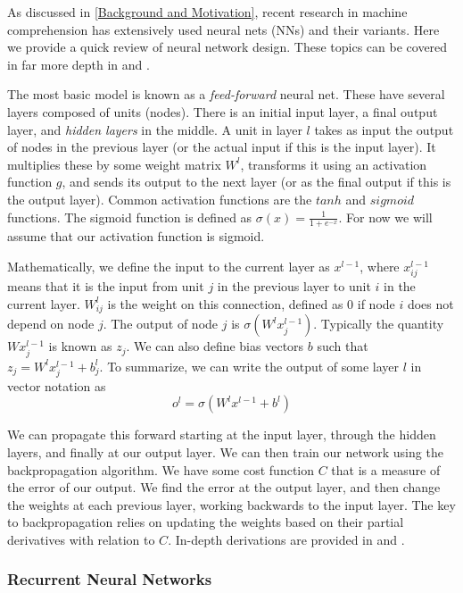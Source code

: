\documentclass[pageno]{jpaper}
\begin{document}
As discussed in \ref{Background and Motivation}, recent research in machine
comprehension has extensively used neural nets (NNs) and their variants. Here we
provide a quick review of neural network design. These topics can be covered in
far more depth in \cite{Bishop1995} and \cite{Nielsen2015}.

The most basic model is known as a \textit{feed-forward} neural net. These have
several layers composed of units (nodes). There is an initial input layer, a
final output layer, and \textit{hidden layers} in the middle. A unit in layer
$l$ takes as input the output of nodes in the previous layer (or the actual
input if this is the input layer). It multiplies these by some weight matrix
$W^l$, transforms it using an activation function $g$, and sends its output to the
next layer (or as the final output if this is the output layer). Common
activation functions are the $tanh$ and $sigmoid$ functions. The sigmoid
function is defined as $\sigma (x) = \frac{1}{1+e^{-x}}$. For now we will assume
that our activation function is sigmoid.

Mathematically, we define the input to the current layer as $x^{l-1}$,
where $x^{l-1}_{ij}$ means that it is the input from unit $j$ in the previous
layer to unit $i$ in the current layer. $W^l_{ij}$ is the weight on this
connection, defined as 0 if node $i$ does not depend on node $j$. The output of
node $j$ is $\sigma ( W^l x^{l-1}_j)$. Typically the quantity $Wx^{l-1}_j$ is
known as $z_j$. We can also define bias vectors $b$ such that $z_j =
W^lx^{l-1}_j + b^l_j$. To summarize, we can write the output of some layer $l$
in vector notation as
$$o^l = \sigma(W^lx^{l-1} + b^l)$$

We can propagate this forward starting at the input layer, through the hidden
layers, and finally at our output layer. We can then train our network using the
backpropagation algorithm. We have some cost function $C$ that is a measure of
the error of our output. We find the error at the output layer, and then change
the weights at each previous layer, working backwards to the input layer. The
key to backpropagation relies on updating the weights based on their partial
derivatives with relation to $C$. In-depth derivations are provided in
\cite{Bishop1995} and \cite{Nielsen2015}.\\

\subsubsection{Recurrent Neural Networks}
\label{Recurrent Neural Networks}
\end{document}
